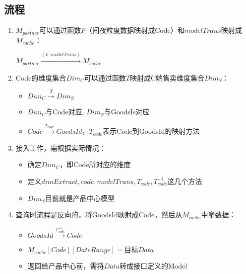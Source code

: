\documentclass[a4paper]{article}
\begin{document}
\subsection{ 流程 }
\begin{enumerate}
\item $M_{partner}$可以通过函数$F$（间夜粒度数据映射成Code）和$modelTrans$映射成$M_{cache}$：
    \begin{center}
        $M_{partner}\stackrel{(F,modelTrans)}{\longrightarrow} M_{cache}$
    \end{center}
\item Code的维度集合$Dim_C$可以通过函数$T$映射成C端售卖维度集合$Dim_S$：
    \begin{itemize}
        \item $Dim_C  \stackrel{T}{\longrightarrow} Dim_S$
        \item $Dim_C $与Code对应, $Dim_S$与GoodsIs对应
        \item $Code  \stackrel{T_{code}}{\longrightarrow} GoodsId$，$T_{code}$表示Code到GoodsId的映射方法
    \end{itemize}
\item 接入工作，需根据实际情况：
    \begin{itemize}
        \item 确定$Dim_C$，即Code所对应的维度
        \item 定义$dimExtract, code, modelTrans, T_{code}, T_{code}^{-1}$这几个方法
        \item $Dim_S$目前就是产品中心模型
    \end{itemize}
\item 查询时流程是反向的，将GoodsId映射成Code，然后从$M_{cache}$中拿数据：
    \begin{itemize}
        \item $GoodsId  \stackrel{T_{code}^{-1}}{\longrightarrow} Code$
        \item $M_{cache}[Code][DateRange] = 目标Data$
        \item 返回给产品中心前，需将$Data$转成接口定义的Model
    \end{itemize}
\end{enumerate}
\end{document}
